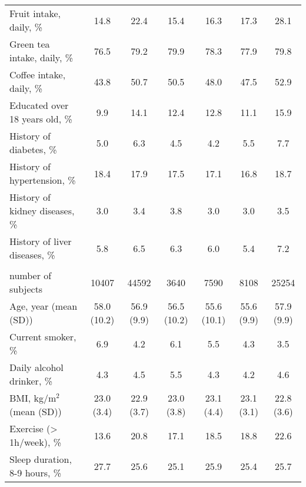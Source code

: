 \documentclass[nutrients,article,submitted,moreauthors,pdftex]{Definitions/mdpi}
\begin{document}
\begin{table}[h]
{\begin{tabular}[t]{lcccccc}
\rowcolor{gray!6}  \hspace{1em}Fruit intake, daily, \% & 14.8 & 22.4 & 15.4 & 16.3 & 17.3 & 28.1\\
\hspace{1em}Green tea intake, daily, \% & 76.5 & 79.2 & 79.9 & 78.3 & 77.9 & 79.8\\
\rowcolor{gray!6}  \hspace{1em}Coffee intake, daily, \% & 43.8 & 50.7 & 50.5 & 48.0 & 47.5 & 52.9\\
\hspace{1em}Educated over 18 years old, \% & 9.9 & 14.1 & 12.4 & 12.8 & 11.1 & 15.9 \\
\rowcolor{gray!6}  \hspace{1em}History of diabetes, \% & 5.0 & 6.3 & 4.5 & 4.2 & 5.5 & 7.7\\
\hspace{1em}History of hypertension, \% & 18.4 & 17.9 & 17.5 & 17.1 & 16.8 & 18.7\\
\rowcolor{gray!6}  \hspace{1em}History of kidney diseases, \% & 3.0 & 3.4 & 3.8 & 3.0 & 3.0 & 3.5\\
\hspace{1em}History of liver diseases, \% & 5.8 & 6.5 & 6.3 & 6.0 & 5.4 & 7.2\\
\rowcolor{gray!6}  \addlinespace[0.3em]
\multicolumn{7}{l}{\textbf{Women (n = 54999)}}\\
\hspace{1em}number of subjects & 10407 & 44592 & 3640 & 7590 & 8108 & 25254\\
\hspace{1em}Age, year (mean (SD)) & 58.0 (10.2) & 56.9 (9.9) & 56.5 (10.2) & 55.6 (10.1) & 55.6 (9.9) & 57.9 (9.9)\\
\rowcolor{gray!6}  \hspace{1em}Current smoker, \% & 6.9 & 4.2 & 6.1 & 5.5 & 4.3 & 3.5\\
\hspace{1em}Daily alcohol drinker, \% & 4.3 & 4.5 & 5.5 & 4.3 & 4.2 & 4.6\\
\rowcolor{gray!6}  \hspace{1em}BMI, kg/m$^2$ (mean (SD)) & 23.0 (3.4) & 22.9 (3.7) & 23.0 (3.8) & 23.1 (4.4) & 23.1 (3.1) & 22.8 (3.6)\\
\hspace{1em}Exercise (> 1h/week), \% & 13.6 & 20.8 & 17.1 & 18.5 & 18.8 & 22.6\\
\rowcolor{gray!6}  \hspace{1em}Sleep duration, 8-9 hours, \% & 27.7 & 25.6 & 25.1 & 25.9 & 25.4 & 25.7\\

\end{tabular}}
\end{table}
\end{document}
